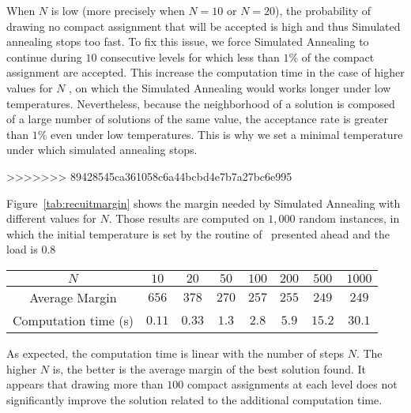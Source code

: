  When $N$ is low (more precisely when $N=10$ or $N = 20$), the probability of drawing no compact assignment that will be accepted is high and thus Simulated annealing stops too fast. To fix this issue, we force Simulated Annealing to continue during $10$ consecutive levels for which less than $1\%$ of the compact assignment are accepted. This increase the computation time in the case of higher values for $N$ , on which the Simulated Annealing would works longer under low temperatures. Nevertheless, because the neighborhood of a solution is composed of a large number of solutions of the same value, the acceptance rate is greater than $1\%$ even under low temperatures. This is why we set a minimal temperature under which simulated annealing stops.

>>>>>>> 89428545ca361058c6a44bcbd4e7b7a27bc6e995
  
Figure~\ref{tab:recuitmargin} shows the margin needed by Simulated Annealing with different values for $N$. Those results are computed on $1,000$ random instances, in which the initial temperature is set by the routine of~\cite{osman1997meta} presented ahead and the load is $0.8$


\begin{comment}
 \begin{figure}[h]
	\centering
	\texttt{[image: Chapitre5/stepsrecuit]}
\caption{ Margin needed to find a solution for Simulated Annealing, with a different number of compact representation drawn to each level.}
\label{fig:stepsrecuit}
\end{figure}
\end{comment}

\begin{center}
\begin{tabular}{ |c|c|c|c|c|c|c|c| }
\hline
    $N$ & $10$& $20$& $50$ &$100$&$200$& $500$& $1000$\\
    \hline
    Average Margin & $656$& $378$& $270$ &$257$ & $255$& $249$& $249$ \\
    \hline
    Computation time (s)& $0.11$& $0.33$& $1.3$ &$2.8$ & $5.9$& $15.2$& $30.1$\\


    \hline
 \end{tabular}
\end{center}

As expected, the computation time is linear with the number of steps $N$. The higher $N$ is, the better is the average margin of the best solution found.
It appears that drawing more than $100$ compact assignments at each level does not significantly improve the solution related to the additional computation time. 

